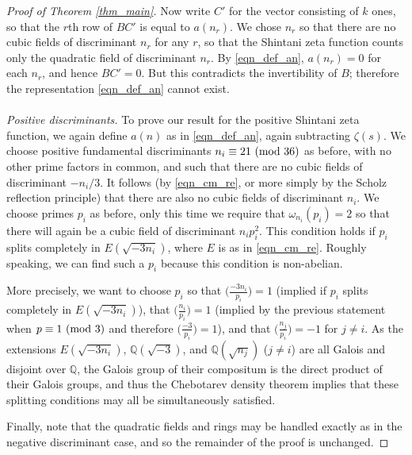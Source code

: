 \documentclass[12pt]{amsart}
\theoremstyle{remark}
\numberwithin{theorem}{section} \numberwithin{equation}{section}
\newcommand{\Q}{\mathbb{Q}}
\newcommand{\textmod}{{\text {\rm mod}}}
\begin{document}
\begin{proof}[Proof of Theorem \ref{thm_main}]
Now write $C'$ for the vector consisting of $k$ ones, so that the $r$th row of
$B C'$ is equal to $a(n_r)$. We chose $n_r$ so that there are no cubic fields of discriminant
$n_r$ for any $r$, so that the Shintani zeta function counts only the quadratic field of discriminant $n_r$.
By \eqref{eqn_def_an}, $a(n_r) = 0$ for each $n_r$, and hence $B C' = 0$.
But this contradicts the invertibility of $B$; therefore the representation \eqref{eqn_def_an} cannot exist.
\\
\\
{\itshape Positive discriminants.}
To prove our result for the positive Shintani zeta function, we again
define $a(n)$ as in \eqref{eqn_def_an}, again
subtracting $ \zeta(s)$. We choose positive fundamental discriminants $n_i \equiv 21 \ (\textmod \ 36)$ as before,
with no other prime factors in common, and
such that there are no cubic fields of discriminant $- n_i/3$. It follows (by \eqref{eqn_cm_re}, or more simply by
the Scholz reflection principle) that there are also no cubic fields of discriminant $n_i$.
We choose primes $p_i$ as
before, only this time we require that $\omega_{n_i}(p_i) = 2$ so that there will again be a cubic field of discriminant
$n_i p_i^2$. This condition holds if $p_i$ splits completely in $E(\sqrt{-3 n_i})$, where $E$ is as in 
\eqref{eqn_cm_re}. Roughly speaking, we can find such a $p_i$ because this condition is non-abelian.

More precisely, we want to choose $p_i$ so that $\big( \frac{-3 n_i}{p_i} \big) = 1$ (implied if
$p_i$ splits completely in $E(\sqrt{-3 n_i})$), that $\big( \frac{n_i}{p_i} \big) = 1$ (implied by the previous statement
when
$p \equiv 1 \ (\textmod \ 3)$ and therefore $\big( \frac{-3}{p_i} \big) = 1$), and that 
$\big( \frac{n_j}{p_i}) = -1$ for $j \neq i$. As the extensions $E(\sqrt{-3 n_i})$, $\Q(\sqrt{-3})$, and $\Q(\sqrt{n_j})$ ($j \neq i$) are
all Galois and disjoint over $\Q$, the Galois group of their compositum is the direct product of their
Galois groups, and thus the Chebotarev density theorem implies that these splitting conditions may all
be simultaneously satisfied.

Finally, note that the quadratic fields and rings may be handled exactly as in
the negative discriminant case, and so the remainder
of the proof is unchanged.

\end{proof}
\end{document}
